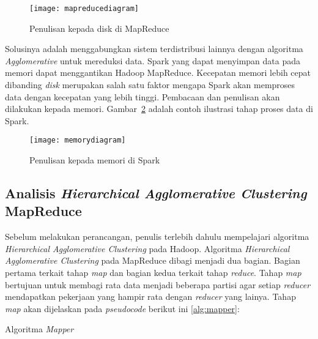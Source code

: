 \begin{figure}[H]
    \centering  
    \texttt{[image: mapreducediagram]}  
    \caption[Penulisan kepada disk di MapReduce]{Penulisan kepada disk di MapReduce} 
    \label{fig:mapreducediagram} 
\end{figure}


Solusinya adalah menggabungkan sistem terdistribusi lainnya dengan  algoritma \textit{Agglomerative} untuk mereduksi data. Spark yang dapat menyimpan data pada memori dapat menggantikan Hadoop MapReduce. Kecepatan memori lebih cepat dibanding \textit{disk} merupakan salah satu faktor mengapa Spark akan memproses data dengan kecepatan yang lebih tinggi.  Pembacaan dan penulisan akan dilakukan kepada memori. Gambar~\ref{fig:memorydiagram} adalah contoh ilustrasi tahap proses data di Spark. 
	
\begin{figure}[H]
    \centering  
    \texttt{[image: memorydiagram]}  
    \caption[Penulisan kepada memori di Spark]{Penulisan kepada memori di Spark} 
    \label{fig:memorydiagram} 
\end{figure}

 
\subsection{Analisis \textit{Hierarchical Agglomerative Clustering} MapReduce}

Sebelum melakukan perancangan, penulis terlebih dahulu mempelajari algoritma \textit{Hierarchical Agglomerative Clustering} pada Hadoop. Algoritma \textit{Hierarchical Agglomerative Clustering}  pada MapReduce dibagi menjadi dua bagian. Bagian pertama terkait tahap \textit{map} dan bagian kedua terkait tahap \textit{reduce}. Tahap \textit{map} bertujuan untuk membagi rata data menjadi beberapa partisi agar setiap \textit{reducer} mendapatkan pekerjaan yang hampir rata dengan \textit{reducer} yang lainya. Tahap \textit{map} akan dijelaskan pada \textit{pseudocode} berikut ini \ref{alg:mapper}:\\


\begin{algorithm}[H]
	\DontPrintSemicolon\SetAlgoNoLine\LinesNumbered
	\BlankLine
	
	
	\caption{Algoritma \textit{Mapper}}
	\label{alg:mapper}
\end{algorithm}

